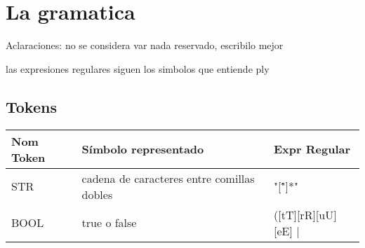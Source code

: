 \section{La gramatica}

Aclaraciones: no se considera var nada reservado, escribilo mejor

las expresiones regulares siguen los simbolos que entiende ply

\subsection{Tokens}

\begin{table}[!htb]
\begin{center}
\begin{tabular}{| l | l | l |}
\hline
Nom Token & Símbolo representado & Expr Regular\\
\hline
STR 	& cadena de caracteres entre comillas dobles & "[\^"]*" \\
\hline
BOOL & true o false & ([tT][rR][uU][eE] | \\


\end{tabular}
\end{center}
\end{table}
